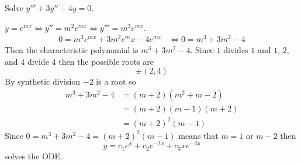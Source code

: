 \documentclass[notes]{subfiles}
\begin{document}
\begin{exercise}
    Solve $y''' + 3y'' - 4y = 0$.
\end{exercise}
\begin{solution}
    $y = e^{mx} \iff y'' = m^2e^{mx} \iff y''' = m^3e^{mx}$.
    \begin{align*}
        0 = m^3e^{mx} + 3m^2{e^mx} - 4e^{mx}
        &\iff 0 = m^3 + 3m^2 - 4
    \end{align*}
    Then the characteristic polynomial is $m^3 + 3m^2 - 4$.
    Since $1$ divides $1$ and $1$, $2$, and $4$ divide $4$ then the possible roots are
    \[
        \pm( 2, 4 )
    \]
    By synthetic division $-2$ is a root so
    \begin{align*}
        m^3 + 3m^2 - 4
        &= (m + 2)(m^2 + m - 2) \\
        &= (m + 2)(m - 1)(m + 2) \\
        &= (m + 2)^2(m - 1)
    \end{align*}
    Since $0 = m^3 + 3m^2 - 4 = (m + 2)^2(m - 1)$ means that $m = 1$ or $m - 2$ then
    \[
        y = c_1e^{x} + c_2e^{-2x} + c_3xe^{-2x}
    \]
    solves the ODE.
\end{solution}
\end{document}
